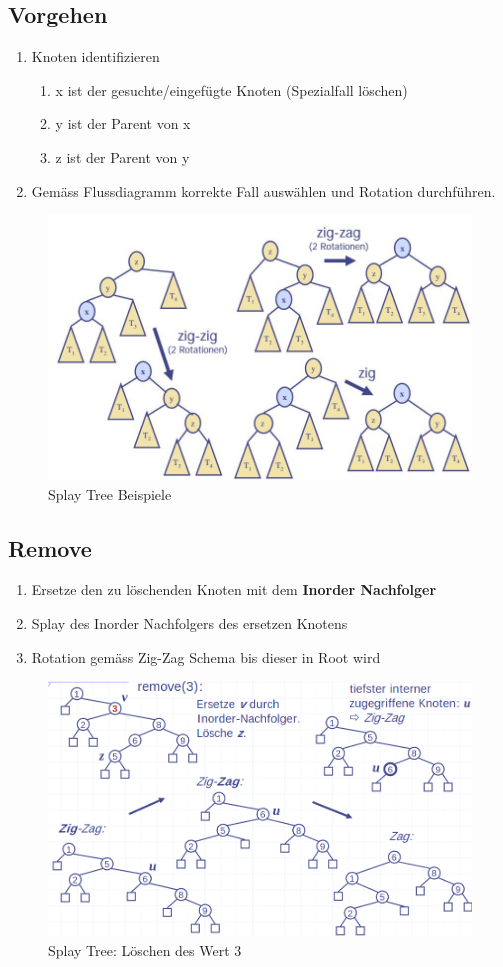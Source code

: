 \subsection{Vorgehen}
\begin{enumerate}
	\item Knoten identifizieren
	\begin{enumerate}
		\item x ist der gesuchte/eingefügte Knoten (Spezialfall löschen)
		\item y ist der Parent von x
		\item z ist der Parent von y
	\end{enumerate}
	\item Gemäss Flussdiagramm korrekte Fall auswählen und Rotation durchführen.
\end{enumerate}

\begin{figure}[h]
	\centering
	\includegraphics[width=0.7\linewidth]{images/splay_trees_zig-zag}
	\caption{Splay Tree Beispiele}
	\label{fig:splaytreeszig-zag}
\end{figure}

\subsection{Remove}
\begin{enumerate}
	\item Ersetze den zu löschenden Knoten mit dem \textbf{Inorder Nachfolger}
	\item Splay des Inorder Nachfolgers des ersetzen Knotens
	\item Rotation gemäss Zig-Zag Schema bis dieser in Root wird
\end{enumerate}

\begin{figure}[h!]
	\centering
	\includegraphics[width=0.7\linewidth]{images/splay_remove}
	\caption{Splay Tree: Löschen des Wert 3}
	\label{fig:splaytreesremove}
\end{figure}

